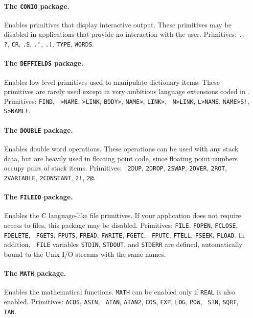 \documentclass[twocolumn]{article}
\begin{document}
\paragraph{The {\tt CONIO} package.}
Enables primitives that display interactive output.  These primitives
may be disabled in applications that provide no interaction with the
user.  Primitives: {\tt .}, {\tt ?}, {\tt CR}, {\tt .S}, {\tt ."},
{\tt .(}, {\tt TYPE}, {\tt WORDS}.

\paragraph{The {\tt DEFFIELDS} package.}
Enables low level primitives used to manipulate dictionary items.
These primitives are rarely used except in very ambitious
language extensions coded in \atlast .  Primitives: {\tt FIND}, {\tt
>NAME}, {\tt >LINK}, {\tt BODY>}, {\tt NAME>}, {\tt LINK>}, {\tt
N>LINK}, {\tt L>NAME}, {\tt NAME>S!}, {\tt S>NAME!}.

\paragraph{The {\tt DOUBLE} package.}
Enables double word operations.  These operations can be used with any
stack data, but are heavily used in floating point code, since
floating point numbers occupy pairs of stack items.  Primitives: {\tt
2DUP}, {\tt 2DROP}, {\tt 2SWAP}, {\tt 2OVER}, {\tt 2ROT}, {\tt
2VARIABLE}, {\tt 2CONSTANT}, {\tt 2!}, {\tt 2@}.

\paragraph{The {\tt FILEIO} package.}
Enables the C language-like file primitives.  If your application does
not require access to files, this package may be disabled.
Primitives: {\tt FILE}, {\tt FOPEN}, {\tt FCLOSE}, {\tt FDELETE}, {\tt
FGETS}, {\tt FPUTS}, {\tt FREAD}, {\tt FWRITE}, {\tt FGETC}, {\tt
FPUTC}, {\tt FTELL}, {\tt FSEEK}, {\tt FLOAD}\@.  In addition, {\tt
FILE} variables {\tt STDIN}, {\tt STDOUT}, and {\tt STDERR} are
defined, automatically bound to the Unix I/O streams with the same
names.

\paragraph{The {\tt MATH} package.}
Enables the mathematical functions.  {\tt MATH} can be enabled only if
{\tt REAL} is also enabled.  Primitives: {\tt ACOS}, {\tt ASIN}, {\tt
ATAN}, {\tt ATAN2}, {\tt COS}, {\tt EXP}, {\tt LOG}, {\tt POW}, {\tt
SIN}, {\tt SQRT}, {\tt TAN}.
\end{document}
